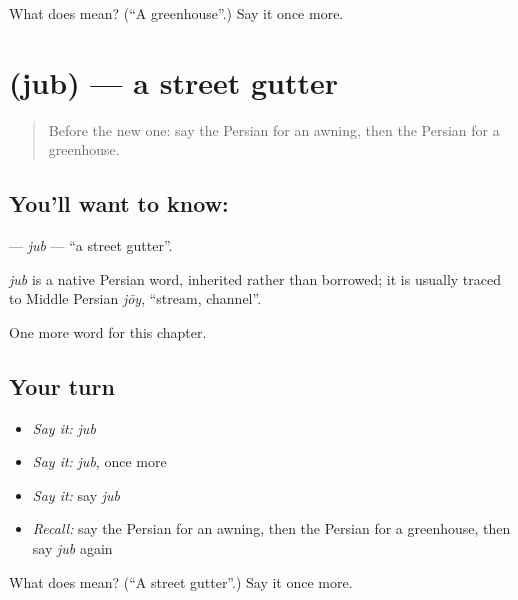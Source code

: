 \begin{tcolorbox}[breakable,colback=teal!4,colframe=teal!35!black,title={Before you move on}]
What does  mean? (\textquotedblleft{}A greenhouse\textquotedblright{}.) Say it once more.
\end{tcolorbox}
\section[\texorpdfstring{\fa{جوب} (jub)}{جوب (jub)}]{ (jub) — a street gutter}

\label{lesson:FA-C268-jub}



\begin{quote}
Before the new one: say the Persian for an awning, then the Persian for a greenhouse.
\end{quote}

\subsection*{You'll want to know: }
\textbf{} — \emph{jub} — \textquotedblleft{}a street gutter\textquotedblright{}.

\begin{cousinweb}
\emph{jub} is a native Persian word, inherited rather than borrowed; it is usually traced to Middle Persian \emph{jōy}, \textquotedblleft{}stream, channel\textquotedblright{}.
\end{cousinweb}

\begin{grammarlens}[title={What you've built}]
One more word for this chapter.
\end{grammarlens}

\subsection*{Your turn}
\begin{itemize}
\raggedright
  \item \emph{Say it:} \emph{jub}
  \item \emph{Say it:} \emph{jub}, once more
  \item \emph{Say it:} say \emph{jub}
  \item \emph{Recall:} say the Persian for an awning, then the Persian for a greenhouse, then say \emph{jub} again
\end{itemize}

\begin{tcolorbox}[breakable,colback=teal!4,colframe=teal!35!black,title={Before you move on}]
What does  mean? (\textquotedblleft{}A street gutter\textquotedblright{}.) Say it once more.
\end{tcolorbox}
